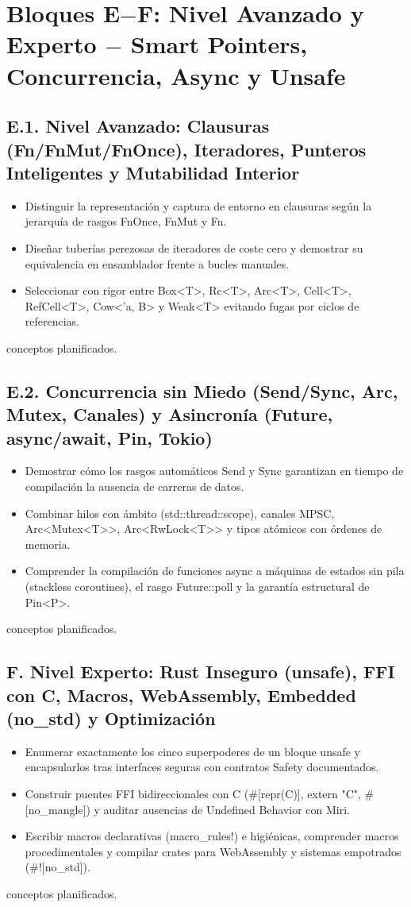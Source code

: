 \documentclass{book}
\begin{document}
\section*{Bloques E\(-\)F: Nivel Avanzado y Experto \(-\) Smart Pointers, Concurrencia, Async y Unsafe}

\subsection*{\checkmark E.1. Nivel Avanzado: Clausuras (Fn/FnMut/FnOnce), Iteradores, Punteros Inteligentes y Mutabilidad Interior}
\begin{itemize}
\item Distinguir la representación y captura de entorno en clausuras según la jerarquía de rasgos FnOnce, FnMut y Fn.
\item Diseñar tuberías perezosas de iteradores de coste cero y demostrar su equivalencia en ensamblador frente a bucles manuales.
\item Seleccionar con rigor entre Box<T>, Rc<T>, Arc<T>, Cell<T>, RefCell<T>, Cow<'a, B> y Weak<T> evitando fugas por ciclos de referencias.
\end{itemize}
 conceptos planificados.

\subsection*{\checkmark E.2. Concurrencia sin Miedo (Send/Sync, Arc, Mutex, Canales) y Asincronía (Future, async/await, Pin, Tokio)}
\begin{itemize}
\item Demostrar cómo los rasgos automáticos Send y Sync garantizan en tiempo de compilación la ausencia de carreras de datos.
\item Combinar hilos con ámbito (std::thread::scope), canales MPSC, Arc<Mutex<T>>, Arc<RwLock<T>> y tipos atómicos con órdenes de memoria.
\item Comprender la compilación de funciones async a máquinas de estados sin pila (stackless coroutines), el rasgo Future::poll y la garantía estructural de Pin<P>.
\end{itemize}
 conceptos planificados.

\subsection*{\checkmark F. Nivel Experto: Rust Inseguro (unsafe), FFI con C, Macros, WebAssembly, Embedded (no\_std) y Optimización}
\begin{itemize}
\item Enumerar exactamente los cinco superpoderes de un bloque unsafe y encapsularlos tras interfaces seguras con contratos Safety documentados.
\item Construir puentes FFI bidireccionales con C (\#[repr(C)], extern "C", \#[no\_mangle]) y auditar ausencias de Undefined Behavior con Miri.
\item Escribir macros declarativas (macro\_rules!) e higiénicas, comprender macros procedimentales y compilar crates para WebAssembly y sistemas empotrados (\#![no\_std]).
\end{itemize}
 conceptos planificados.
\end{document}
